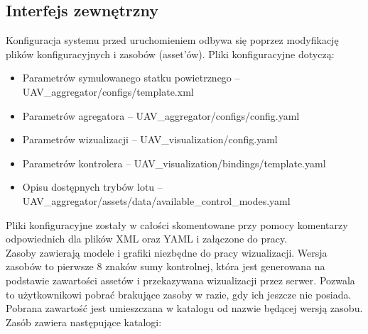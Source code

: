 \documentclass[15pt]{sprawozdanie}
\begin{document}
\newpage
\subsection{Interfejs zewnętrzny}

Konfiguracja systemu przed uruchomieniem odbywa się poprzez modyfikację plików konfiguracyjnych i zasobów (asset'ów). Pliki konfiguracyjne dotyczą:

\begin{itemize}
\item Parametrów symulowanego statku powietrznego --\\ UAV\_aggregator/configs/template.xml
\item Parametrów agregatora -- UAV\_aggregator/configs/config.yaml
\item Parametrów wizualizacji -- UAV\_visualization/config.yaml
\item Parametrów kontrolera --  UAV\_visualization/bindings/template.yaml
\item Opisu dostępnych trybów lotu --\\ UAV\_aggregator/assets/data/available\_control\_modes.yaml
\end{itemize}

Pliki konfiguracyjne zostały w całości skomentowane przy pomocy komentarzy odpowiednich dla plików XML oraz YAML  i załączone do pracy.\\


Zasoby zawierają modele i grafiki niezbędne do pracy wizualizacji. Wersja zasobów to pierwsze 8 znaków sumy kontrolnej, która jest generowana na podstawie zawartości assetów i przekazywana wizualizacji przez serwer. Pozwala to użytkownikowi pobrać brakujące zasoby w razie, gdy ich jeszcze nie posiada. Pobrana zawartość jest umieszczana w katalogu od nazwie będącej wersją zasobu. Zasób zawiera następujące katalogi:
\end{document}
